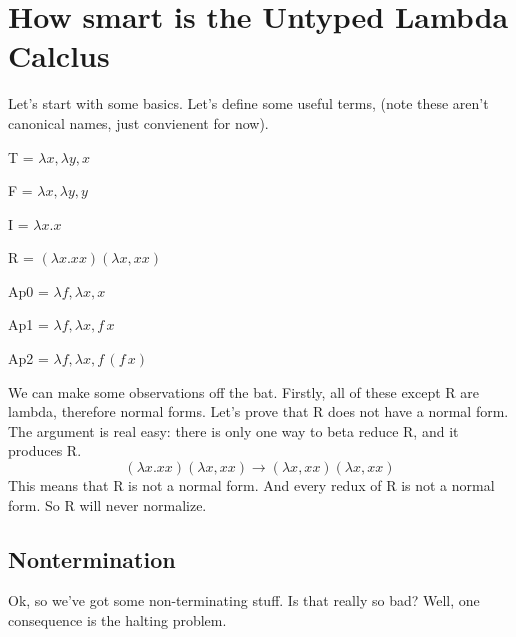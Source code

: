 \documentclass[12pt]{article}
\begin{document}
\section{How smart is the Untyped Lambda Calclus}
Let's start with some basics.
Let's define some useful terms, (note these aren't canonical names, just convienent for now).
\begin{description}
    \item T = $\lambda x, \lambda y, x$
    \item F = $\lambda x, \lambda y, y$
    \item I = $\lambda x.x$
    \item R = $(\lambda x.xx)(\lambda x, xx)$
    \item Ap0 = $\lambda f, \lambda x, x$
    \item Ap1 = $\lambda f, \lambda x, f\, x$
    \item Ap2 = $\lambda f, \lambda x, f\, (f\, x)$
\end{description}

\noindent We can make some observations off the bat.
Firstly, all of these except R are lambda, therefore normal forms.
Let's prove that R does not have a normal form.
The argument is real easy: there is only one way to beta reduce R, and it produces R. 
\[
  (\lambda x.xx)(\lambda x, xx) \rightarrow 
  (\lambda x, xx)(\lambda x, xx)
\]
This means that R is not a normal form. And every redux of R is not a normal form.
So R will never normalize.

\subsection{Nontermination}
Ok, so we've got some non-terminating stuff. 
Is that really so bad?
Well, one consequence is the halting problem.
\end{document}
